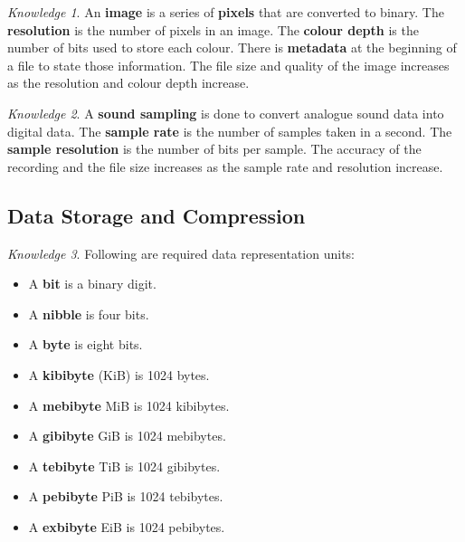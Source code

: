 \documentclass[8pt]{article}
\theoremstyle{remark}
\newtheorem{knowledge}{Knowledge}[subsection]
\begin{document}
        \begin{knowledge}
            An \textbf{image} is a series of \textbf{pixels} that are converted to binary. The \textbf{resolution} is the number of pixels in an image. The \textbf{colour depth} is the number of bits used to store each colour. There is \textbf{metadata} at the beginning of a file to state those information. The file size and quality of the image increases as the resolution and colour depth increase.
        \end{knowledge}

        \begin{knowledge}
            A \textbf{sound sampling} is done to convert analogue sound data into digital data. The \textbf{sample rate} is the number of samples taken in a second. The \textbf{sample resolution} is the number of bits per sample. The accuracy of the recording and the file size increases as the sample rate and resolution increase.
        \end{knowledge}

        \subsection{Data Storage and Compression}

        \begin{knowledge}
            Following are required data representation units:
            \begin{itemize}
                \item A \textbf{bit} is a binary digit.
                \item A \textbf{nibble} is four bits.
                \item A \textbf{byte} is eight bits.
                \item A \textbf{kibibyte} (KiB) is 1024 bytes.
                \item A \textbf{mebibyte} {MiB} is 1024 kibibytes.
                \item A \textbf{gibibyte} {GiB} is 1024 mebibytes.
                \item A \textbf{tebibyte} {TiB} is 1024 gibibytes.
                \item A \textbf{pebibyte} {PiB} is 1024 tebibytes.
                \item A \textbf{exbibyte} {EiB} is 1024 pebibytes.
            \end{itemize}
        \end{knowledge}
\end{document}
